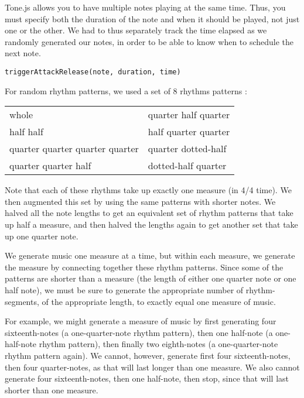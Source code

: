 \documentclass[12pt,a4paper]{article}
\begin{document}
Tone.js allows you to have multiple notes playing at the same time. Thus, you must specify both the duration of the note and when it should be played, not just one or the other. We had to thus separately track the time elapsed as we randomly generated our notes, in order to be able to know when to schedule the next note.

\texttt{triggerAttackRelease(note, duration, time)}

For random rhythm patterns, we used a set of 8 rhythms patterns \cite{common-rhythms}:

\begin{center}
\begin{tabular}{p{6cm} p{6cm}}
whole & %
quarter half quarter \\ %
half half & %
half quarter quarter \\ %
quarter quarter quarter quarter & %
quarter dotted-half \\ %
quarter quarter half & %
dotted-half quarter %
\end{tabular}
\end{center}

Note that each of these rhythms take up exactly one measure (in 4/4 time).
We then augmented this set by using the same patterns with shorter notes. We halved all the note lengths to get an equivalent set of rhythm patterns that take up half a measure, and then halved the lengths again to get another set that take up one quarter note.

We generate music one measure at a time, but within each measure, we generate the measure by connecting together these rhythm patterns. Since some of the patterns are shorter than a measure (the length of either one quarter note or one half note), we must be sure to generate the appropriate number of rhythm-segments, of the appropriate length, to exactly equal one measure of music.

For example, we might generate a measure of music by first generating four sixteenth-notes (a one-quarter-note rhythm pattern), then one half-note (a one-half-note rhythm pattern), then finally two eighth-notes (a one-quarter-note rhythm pattern again). We cannot, however, generate first four sixteenth-notes, then four quarter-notes, as that will last longer than one measure. We also cannot generate four sixteenth-notes, then one half-note, then stop, since that will last shorter than one measure.
\end{document}
